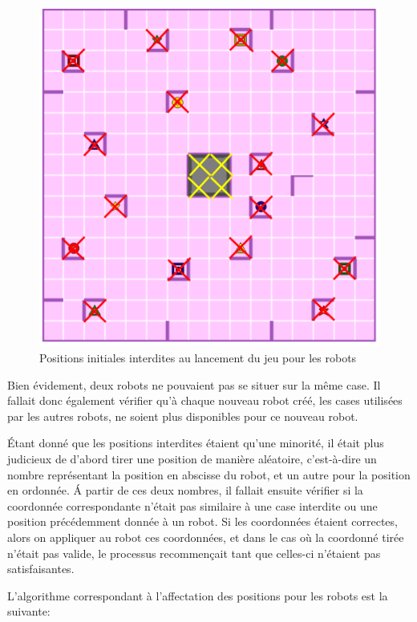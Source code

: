 \documentclass[a4paper, 12pt]{article}
\begin{document}
        \begin{figure}[H]
            \centering
            \includegraphics[scale=0.17]{images/positionInterdite.png}
            \caption{Positions initiales interdites au lancement du jeu pour les robots}
        \end{figure}
        
        Bien évidement, deux robots ne pouvaient pas se situer sur la même case. Il fallait donc également vérifier qu'à chaque nouveau robot créé, les cases utilisées par les autres robots, ne soient plus disponibles pour ce nouveau robot.
        
        Étant donné que les positions interdites étaient qu'une minorité, il était plus judicieux de d'abord tirer une position de manière aléatoire, c'est-à-dire un nombre représentant la position en abscisse du robot, et un autre pour la position en ordonnée. Á partir de ces deux nombres, il fallait ensuite vérifier si la coordonnée correspondante n'était pas similaire à une case interdite ou une position précédemment donnée à un robot. Si les coordonnées étaient correctes, alors on appliquer au robot ces coordonnées, et dans le cas où la coordonné tirée n'était pas valide, le processus recommençait tant que celles-ci n'étaient pas satisfaisantes. 
        
        L'algorithme correspondant à l'affectation des positions pour les robots est la suivante:
    
\end{document}
